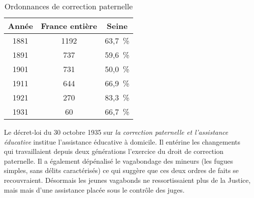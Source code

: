 \begin{table}[h]
\centering
\caption{Ordonnances de correction paternelle}
\begin{tabular}{ccc}
Année & France entière & Seine \\
\hline
1881 & 1192 & 63,7~\% \\
1891 & 737 & 59,6~\% \\
1901 & 731 & 50,0~\% \\
1911 & 644 & 66,9~\% \\
1921 & 270 & 83,3~\% \\
1931 & 60 & 66,7~\%
\end{tabular}
\end{table}
 
 Le décret-loi du 30 octobre 1935 sur {\emph{la correction paternelle et l'assistance éducative}} institue l'assistance éducative à domicile. Il entérine les changements qui travaillaient depuis deux générations l'exercice du droit de correction paternelle. Il a également dépénalisé le vagabondage des mineurs (les fugues simples, sans délits caractérisés) ce qui suggère que ces deux ordres de faits se recouvraient. Désormais les jeunes vagabonds ne ressortissaient plus de la Justice, mais mais d'une assistance placée sous le contrôle des juges. 



